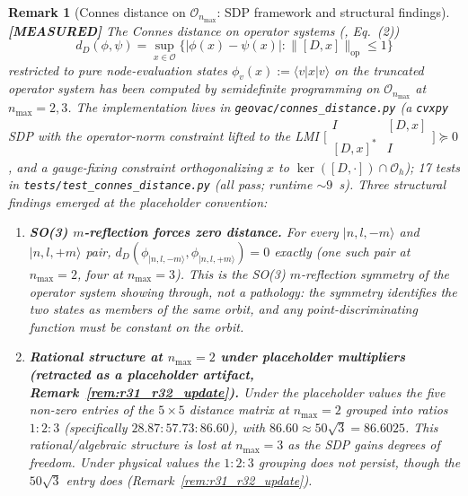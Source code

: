 \documentclass[11pt]{article}
\newtheorem{remark}{Remark}
\begin{document}
\begin{remark}[Connes distance on $\mathcal{O}_{n_{\max}}$: SDP framework
and structural findings]
\label{rem:connes_distance}
\textbf{[MEASURED]} The Connes distance on operator systems
(\cite{connes_vs2021}, Eq.~(2))
\[
   d_D(\phi, \psi) = \sup_{x \in \mathcal{O}} \big\{ |\phi(x) - \psi(x)|
      : \|[D, x]\|_{\mathrm{op}} \le 1 \big\}
\]
restricted to pure node-evaluation states $\phi_v(x) := \langle v | x | v
\rangle$ on the truncated operator system has been computed by
semidefinite programming on $\mathcal{O}_{n_{\max}}$ at $n_{\max} = 2, 3$.
The implementation lives in \texttt{geovac/connes\_distance.py} (a
\texttt{cvxpy} SDP with the operator-norm constraint lifted to the LMI
$\bigl[\begin{smallmatrix} I & [D, x] \\ [D, x]^* & I \end{smallmatrix}\bigr]
\succeq 0$, and a gauge-fixing constraint orthogonalizing $x$ to
$\ker([D, \cdot]) \cap \mathcal{O}_h$); 17 tests in
\texttt{tests/test\_connes\_distance.py} (all pass; runtime ${\sim}9$~s).
Three structural findings emerged at the placeholder convention:

\begin{enumerate}
\item \textbf{SO(3) $m$-reflection forces zero distance.}  For every
   $|n, l, -m\rangle$ and $|n, l, +m\rangle$ pair, $d_D(\phi_{|n,l,-m\rangle},
   \phi_{|n,l,+m\rangle}) = 0$ exactly (one such pair at $n_{\max} = 2$,
   four at $n_{\max} = 3$).  This is the SO(3) $m$-reflection symmetry
   of the operator system showing through, not a pathology: the symmetry
   identifies the two states as members of the same orbit, and any
   point-discriminating function must be constant on the orbit.

\item \textbf{Rational structure at $n_{\max} = 2$ under placeholder
   multipliers (retracted as a placeholder artifact,
   Remark~\ref{rem:r31_r32_update}).}  Under the placeholder values the
   five non-zero entries of the $5 \times 5$ distance matrix at
   $n_{\max} = 2$ grouped into ratios $1 : 2 : 3$ (specifically
   $28.87 : 57.73 : 86.60$), with $86.60 \approx 50\sqrt{3} = 86.6025$.  This rational/algebraic
   structure is lost at $n_{\max} = 3$ as the SDP gains degrees of
   freedom.  Under physical values the $1{:}2{:}3$ grouping does not
   persist, though the $50\sqrt{3}$ entry does
   (Remark~\ref{rem:r31_r32_update}).


\end{enumerate}
\end{remark}
\end{document}
